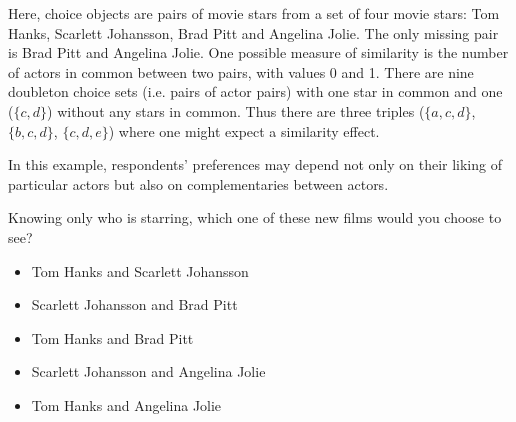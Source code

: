 
Here, choice objects are pairs of movie stars from a set of four movie stars: Tom Hanks, Scarlett Johansson, Brad Pitt and Angelina Jolie.
The only missing pair is Brad Pitt and Angelina Jolie.
One possible measure of similarity is the number of actors in common between two pairs, with values 0 and 1.
There are nine doubleton choice sets (i.e. pairs of actor pairs) with one star in common and one ($\{c,d\}$) without any stars in common.
Thus there are three triples ($\{a,c,d\}$, $\{b,c,d\}$, $\{c,d,e\}$) where one might expect a similarity effect.

In this example, respondents' preferences may depend not only on their liking of particular actors but also on complementaries between actors.
{}
\begin{tcolorbox}
Knowing only who is starring, which one of these new films would you choose to see?

\begin{itemize}
	\setlength\itemsep{-5pt}
	\item Tom Hanks and Scarlett Johansson
	\item Scarlett Johansson and Brad Pitt
	\item Tom Hanks and Brad Pitt
	\item Scarlett Johansson and Angelina Jolie
	\item Tom Hanks and Angelina Jolie
\end{itemize}
\end{tcolorbox}
